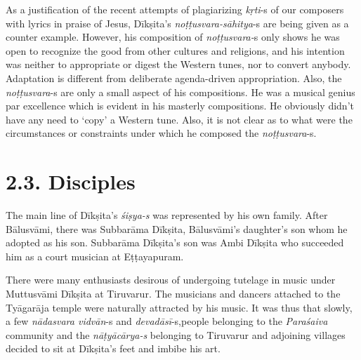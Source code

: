 As a justification of the recent attempts of plagiarizing \textit{kṛti}-s of our composers with lyrics in praise of Jesus, Dīkṣita’s \textit{noṭṭusvara-sāhitya}-s are being given as a counter example. However, his composition of \textit{noṭṭusvara-}s only shows he was open to recognize the good from other cultures and religions, and his intention was neither to appropriate or digest the Western tunes, nor to convert anybody. Adaptation is different from deliberate agenda-driven appropriation. Also, the \textit{noṭṭusvara}-s are only a small aspect of his compositions. He was a musical genius par excellence which is evident in his masterly compositions. He obviously didn’t have any need to ‘copy’ a Western tune. Also, it is not clear as to what were the circumstances or constraints under which he composed the \textit{noṭṭusvara}-s.



\section*{2.3. Disciples}

The main line of Dīkṣita’s \textit{śiṣya-s} was represented by his own family. After Bālusvāmi, there was Subbarāma Dīkṣita, Bālusvāmi’s daughter’s son whom he adopted as his son. Subbarāma Dīkṣita’s son was Ambi Dīkṣita who succeeded him as a court musician at Eṭṭayapuram.

There were many enthusiasts desirous of undergoing tutelage in music under Muttusvāmi Dīkṣita at Tiruvarur. The musicians and dancers attached to the Tyāgarāja temple were naturally attracted by his music. It was thus that slowly, a few \textit{nādasvara vidvān}-s and \textit{devadāsī}-s,\break people belonging to the \textit{Paraśaiva} community and the \textit{nāṭyācārya-s} belonging to Tiruvarur and adjoining villages decided to sit at Dīkṣita's feet and imbibe his art.

